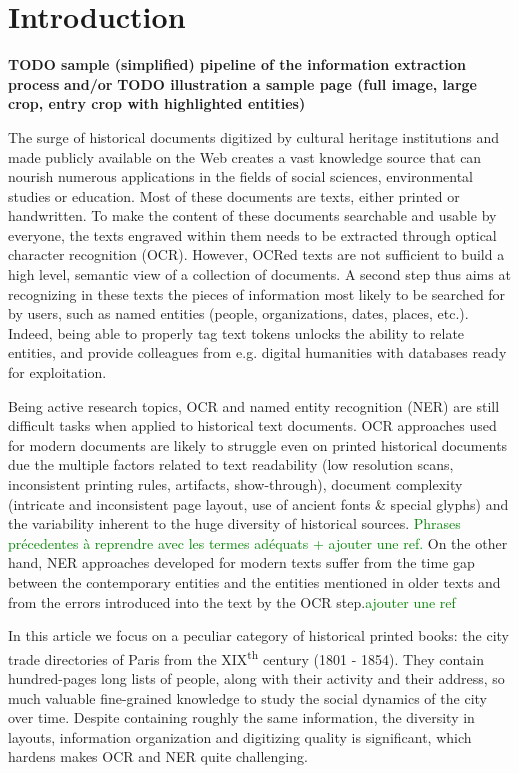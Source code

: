 \section{Introduction}

\textbf{TODO sample (simplified) pipeline of the information extraction process}
\textbf{and/or}
\textbf{TODO illustration a sample page (full image, large crop, entry crop with highlighted entities)}

The surge of historical documents digitized by cultural heritage institutions and made publicly available on the Web creates a vast knowledge source that can nourish numerous applications in the fields of social sciences, environmental studies or education.
Most of these documents are texts, either printed or handwritten.
To make the content of these documents searchable and usable by everyone, the texts engraved within them needs to be extracted through optical character recognition (OCR). 
However, OCRed texts are not sufficient to build a high level, semantic view of a collection of documents. A second step thus aims at recognizing in these texts the pieces of information most likely to be searched for by users, such as named entities (people, organizations, dates, places, etc.). Indeed, being able to properly tag text tokens unlocks the ability to relate entities, and provide colleagues from e.g. digital humanities with databases ready for exploitation.

Being active research topics, OCR and named entity recognition (NER) are still difficult tasks when applied to historical text documents.
OCR approaches used for modern documents are likely to struggle even on printed historical documents due the multiple factors related to text readability (low resolution scans, inconsistent printing rules, artifacts, show-through), document complexity (intricate and inconsistent page layout, use of ancient fonts \& special glyphs) and the variability inherent to the huge diversity of historical sources.
\textcolor{green}{Phrases précedentes à reprendre avec les termes adéquats + ajouter une ref.}
On the other hand, NER approaches developed for modern texts suffer from the time gap between the contemporary entities and the entities mentioned in older texts and from the errors introduced into the text by the OCR step.\textcolor{green}{ajouter une ref}

In this article we focus on a peculiar category of historical printed books: the city trade directories of Paris from the XIX\textsuperscript{th} century (1801 - 1854).
They contain hundred-pages long lists of people, along with their activity and their address, so much valuable fine-grained knowledge to study the social dynamics of the city over time.
Despite containing roughly the same information, the diversity in layouts, information organization and digitizing quality is significant, which hardens makes OCR and NER quite challenging.

